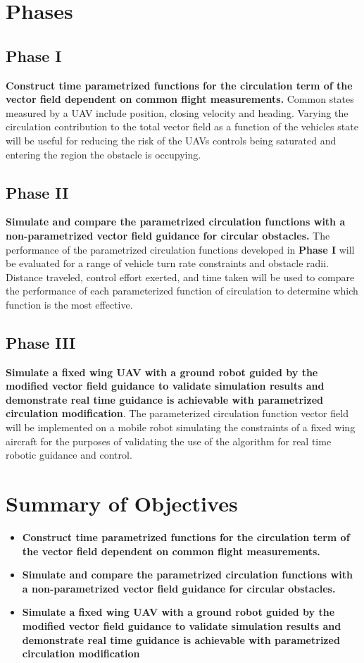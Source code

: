 \documentclass[numbered,pdftex]{ohio-etd}
\begin{document}
\section{Phases}
\subsection{Phase I}
\textbf{Construct time parametrized functions for the circulation term of the vector field dependent on common flight measurements.} Common states measured by a UAV include position, closing velocity and heading. Varying the circulation contribution to the total vector field as a function of the vehicles state will be useful for reducing the risk of the UAVs controls being saturated and entering the region the obstacle is occupying.  


\subsection{Phase II}
\textbf{Simulate and compare the parametrized circulation functions with a non-parametrized vector field guidance for circular obstacles.} The performance of the parametrized circulation functions developed in \textbf{Phase I} will be evaluated for a range of vehicle turn rate constraints and obstacle radii. Distance traveled, control effort exerted, and time taken will be used to compare the performance of each parameterized function of circulation to determine which function is the most effective. 


\subsection{Phase III}
\textbf{Simulate a fixed wing UAV with a ground robot guided by the modified vector field guidance to validate simulation results and demonstrate real time guidance is achievable with parametrized circulation modification}. The parameterized circulation function vector field will be implemented on a mobile robot simulating the constraints of a fixed wing aircraft for the purposes of validating the use of the algorithm for real time robotic guidance and control.

\section{Summary of Objectives}
\begin{itemize}
	\item \textbf{Construct time parametrized functions for the circulation term of the vector field dependent on common flight measurements.}
	\item \textbf{Simulate and compare the parametrized circulation functions with a non-parametrized vector field guidance for circular obstacles.}
	\item \textbf{Simulate a fixed wing UAV with a ground robot guided by the modified vector field guidance to validate simulation results and demonstrate real time guidance is achievable with parametrized circulation modification}
\end{itemize}
\end{document}
